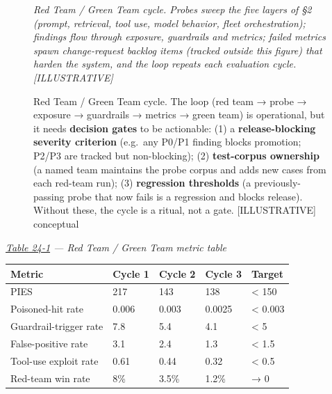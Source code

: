 \begin{figure}
\centering
{}
\caption[Red Team / Green Team cycle]{Red Team / Green Team cycle. The loop (red team → probe → exposure → guardrails → metrics → green team) is operational, but it needs \textbf{decision gates} to be actionable: (1) a \textbf{release-blocking severity criterion} (e.g.~any P0/P1 finding blocks promotion; P2/P3 are tracked but non-blocking); (2) \textbf{test-corpus ownership} (a named team maintains the probe corpus and adds new cases from each red-team run); (3) \textbf{regression thresholds} (a previously-passing probe that now fails is a regression and blocks release). Without these, the cycle is a ritual, not a gate. \mbox{{[}ILLUSTRATIVE{]}} conceptual}

\label{fig:24.1}\emph{Red Team / Green Team cycle. Probes sweep the five layers of §2
(prompt, retrieval, tool use, model behavior, fleet orchestration);
findings flow through exposure, guardrails and metrics; failed metrics
spawn change-request backlog items (tracked outside this figure) that
harden the system, and the loop repeats each evaluation cycle.
\mbox{{[}ILLUSTRATIVE{]}}}

\end{figure}\emph{\hyperref[tab:24.1]{Table 24-1} --- Red Team / Green Team metric table}

\nopagebreak[4]
\begin{longtable}[]{@{}lllll@{}}
\toprule\noalign{}
Metric & Cycle 1 & Cycle 2 & Cycle 3 & Target \\
\midrule\noalign{}
\endhead
\bottomrule\noalign{}
\endlastfoot
PIES & 217 & 143 & 138 & \textless{} 150 \\
\noalign{\label{tab:24.1}}
Poisoned-hit rate & 0.006 & 0.003 & 0.0025 & \textless{} 0.003 \\
Guardrail-trigger rate & 7.8 & 5.4 & 4.1 & \textless{} 5 \\
False-positive rate & 3.1 & 2.4 & 1.3 & \textless{} 1.5 \\
Tool-use exploit rate & 0.61 & 0.44 & 0.32 & \textless{} 0.5 \\
Red-team win rate & 8\% & 3.5\% & 1.2\% & → 0 \\
\end{longtable}
